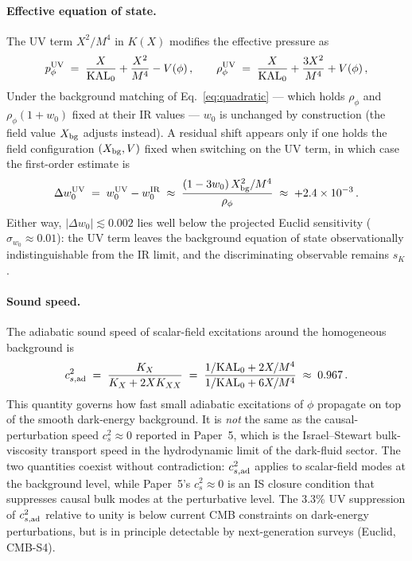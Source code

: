 \documentclass[12pt,a4paper]{article}
\newcommand{\KAL}{\mathrm{KAL}_0}
\newcommand{\sK}{s_K}
\begin{document}
\paragraph{Effective equation of state.}
The UV term $X^2/M^4$ in $K(X)$ modifies the effective pressure as
\begin{equation}
  p_\phi^{\rm UV} \;=\; \frac{X}{\KAL} + \frac{X^2}{M^4} - V(\phi)\,,
  \qquad
  \rho_\phi^{\rm UV} \;=\; \frac{X}{\KAL} + \frac{3X^2}{M^4} + V(\phi)\,,
\end{equation}
Under the background matching of Eq.~\eqref{eq:quadratic} --- which holds
$\rho_\phi$ and $\rho_\phi(1+w_0)$ fixed at their IR values --- $w_0$ is
unchanged by construction (the field value $X_{\rm bg}$ adjusts instead).
A residual shift appears only if one holds the field configuration
$(X_{\rm bg}, V)$ fixed when switching on the UV term, in which case the
first-order estimate is
\begin{equation}
  \Delta w_0^{\rm UV}
  \;=\; w_0^{\rm UV} - w_0^{\rm IR}
  \;\approx\; \frac{(1-3w_0)\,X_{\rm bg}^2/M^4}{\rho_\phi}
  \;\approx\; +2.4\times10^{-3}\,.
\end{equation}
Either way, $|\Delta w_0| \lesssim 0.002$ lies well below the projected
Euclid sensitivity ($\sigma_{w_0} \approx 0.01$): the UV term leaves the
background equation of state observationally indistinguishable from the
IR limit, and the discriminating observable remains $\sK$.

\paragraph{Sound speed.}
The adiabatic sound speed of scalar-field excitations around the homogeneous
background is
\begin{equation}
  c_{s,\rm ad}^2 \;=\; \frac{K_X}{K_X + 2X K_{XX}}
          \;=\; \frac{1/\KAL + 2X/M^4}{1/\KAL + 6X/M^4}
          \;\approx\; 0.967\,.
\end{equation}
This quantity governs how fast small adiabatic excitations of $\phi$ propagate
on top of the smooth dark-energy background.
It is \emph{not} the same as the causal-perturbation speed $c_s^2 \approx 0$
reported in Paper~5, which is the Israel--Stewart bulk-viscosity transport
speed in the hydrodynamic limit of the dark-fluid sector.
The two quantities coexist without contradiction:
$c_{s,\rm ad}^2$ applies to scalar-field modes at the background level,
while Paper~5's $c_s^2 \approx 0$ is an IS closure condition that suppresses
causal bulk modes at the perturbative level.
The 3.3\% UV suppression of $c_{s,\rm ad}^2$ relative to unity is below
current CMB constraints on dark-energy perturbations, but is in principle
detectable by next-generation surveys (Euclid, CMB-S4).
\end{document}

